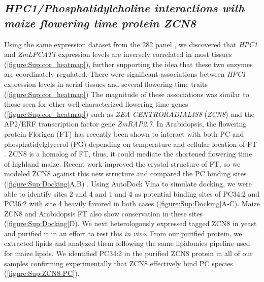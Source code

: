 \documentclass[9pt,twocolumn,twoside,lineno]{biorxiv}
\newcommand{\hpc}{\textit{HPC1}\xspace}
\begin{document}
\subsection{\textit{HPC1/Phosphatidylcholine interactions with maize flowering time protein ZCN8}}
Using the same expression dataset from the 282 panel \cite{Kremling2018-gn}, we discovered that \hpc and \textit{ZmLPCAT1} expression levels are inversely correlated in most tissues (\cref{figure:Sup:cor_heatmap}), further supporting the idea that these two enzymes are coordinately regulated.
There were significant associations between \hpc expression levels in aerial tissues and several flowering time traits (\cref{figure:Sup:cor_heatmap})
The magnitude of these associations was similar to those seen for other well-characterized flowering time genes (\cref{figure:Sup:cor_heatmap}) such as \textit{ZEA CENTRORADIALIS8} (\textit{ZCN8})  and the AP2/ERF transcription factor gene \textit{ZmRAP2.7}.  
In Arabidopsis, the flowering protein Florigen (FT) has recently been shown to interact with both PC and phosphatidylglycerol (PG) depending on temperature and cellular location of FT \cite{Nakamura2014-qf, Susila2021-dz}.
ZCN8 is a homolog of FT, thus, it could mediate the shortened flowering time of highland maize. 
Recent work improved the crystal structure of FT, so we modeled ZCN8 against this new structure and compared the PC binding sites (\cref{figure:Sup:Docking}A,B) \cite{Nakamura2019-ht}. 
Using AutoDock Vina to simulate docking, we were able to identify sites 2 and 4 and 1 and 4 as potential binding sites of PC34:2 and PC36:2 with site 4 heavily favored in both cases (\cref{figure:Sup:Docking}A-C).
Maize ZCN8 and  Arabidopsis FT also show conservation in these sites (\cref{figure:Sup:Docking}D). 
We next heterologously expressed tagged ZCN8 in yeast and purified it in an effort to test this \textit{in vivo}. 
From our purified protein, we extracted lipids and analyzed them following the same lipidomics pipeline used for maize lipids. 
We identified PC34:2 in the purified ZCN8 protein in all of our samples confirming experimentally that ZCN8 effectively bind PC species (\cref{figure:Sup:ZCN8-PC}).
\end{document}
